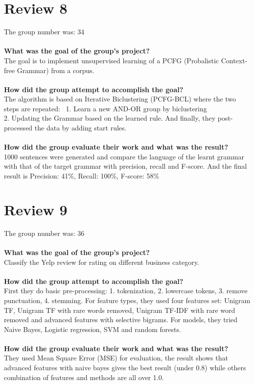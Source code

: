 \documentclass[paper=a4, fontsize=11pt]{scrartcl} %
\numberwithin{equation}{section} %
\numberwithin{figure}{section} %
\numberwithin{table}{section} %
\begin{document}
\section{Review 8}
{The group number was: 34} \\
\ \\
{\bf What was the goal of the group's project?} \\
The goal is to implement unsupervised learning of a PCFG (Probalistic Context-free Grammar) from a corpus. \\
\ \\
{\bf How did the group attempt to accomplish the goal?}\\
The algorithm is based on Iterative Biclustering (PCFG-BCL) where the two steps are repeated:  \
1. Learn a new AND-OR group by biclustering\\
2. Updating the Grammar based on the learned rule. And finally, they post-processed the data by adding start rules. \\
\ \\
{\bf How did the group evaluate their work and what was the result?}\\
1000 sentences were generated and compare the language of the learnt grammar with that of the target
grammar with precision, recall and F-score. And the final result is Precision: 41\%, Recall: 100\%, F-score: 58\%

\section{Review 9}
{The group number was: 36} \\
\ \\
{\bf What was the goal of the group's project?} \\
Classify the Yelp review for rating on different business category.\\
\ \\
{\bf How did the group attempt to accomplish the goal?}\\
First they do basic pre-processing: 1. tokenization, 2. lowercase tokens, 3. remove punctuation, 4. stemming. For feature types,
they used four features set: Unigram TF, Unigram TF with rare words removed, Unigram TF-IDF with rare word removed and advanced features with
selective bigrams. For models, they tried Naive Bayes, Logistic regression, SVM and random forests.\\
\ \\
{\bf How did the group evaluate their work and what was the result?}\\
They used Mean Square Error (MSE) for evaluation, the result shows that advanced features with naive bayes gives the 
best result (under 0.8) while others combination of features and methods are all over 1.0.
\end{document}
